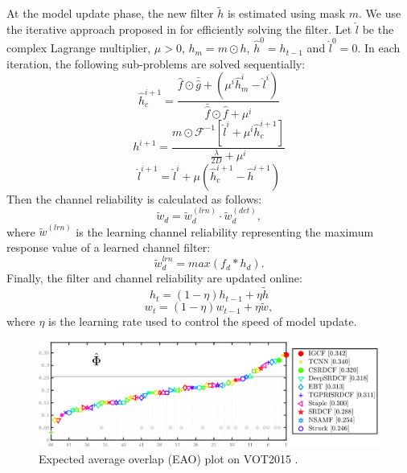 \documentclass[review]{elsarticle}
\begin{document}
\begin{CJK*}{UTF8}{gbsn}
At the model update phase, the new filter $\tilde{h}$ is estimated using mask $m$. We use the iterative approach proposed in \cite{Lukezic2017DiscriminativeCF} for efficiently solving the filter. Let $\hat{l}$ be the complex Lagrange multiplier, $\mu > 0$, $h_m=m \odot h$, $\hat{h}^0 = h_{t-1}$ and $\hat{l}^0 = 0$. In each iteration, the following sub-problems are solved sequentially:
\begin{equation} \label{eq:h1}
\hat{h}_c^{i+1} = \frac{\hat{f} \odot \bar{\hat{g}} +(\mu^i \hat{h}_m^i - \hat{l}^i)}{\bar{\hat{f}} \odot \hat f + \mu^i}
\end{equation}
\begin{equation}
h^{i+1} = \frac{m \odot \mathcal{F}^{-1}[\hat{l}^i + \mu^i\hat{h}_c^{i+1}]}{\frac{\lambda}{2D} + \mu^i}
\end{equation}
\begin{equation} \label{eq:h3}
\hat{l}^{i+1} = \hat{l}^i + \mu(\hat{h}_c^{i+1} - \hat{h}^{i+1})
\end{equation}
Then the channel reliability \cite{Lukezic2017DiscriminativeCF} is calculated as follows: 
\begin{equation} \label{eq:c}
\tilde w_d = \tilde w_d^{(lrn)} \cdot \tilde w_d^{(det)},
\end{equation}
where $\tilde{w}^{(lrn)}$ is the learning channel reliability representing the maximum response value of a learned channel filter:
\begin{equation} \label{eq:lrn}
\tilde{w}_d^{lrn} = max(f_d * h_d).
\end{equation}
Finally, the filter and channel reliability are updated online:
\begin{equation} \label{eq:update1}
h_t = (1 - \eta)h_{t-1} + \eta \tilde{h}
\end{equation}
\begin{equation} \label{eq:update2}
w_t = (1-\eta)w_{t-1} + \eta \tilde{w},
\end{equation}
where $\eta$ is the learning rate used to control the speed of model update.

\begin{figure}
    \centering
    \includegraphics[width=12cm]{images/vot/eao_rank_vot2015.png}
    \caption{Expected average overlap (EAO) plot on VOT2015 \cite{Kristan2015TheVO}.}
    \label{fig:vot15}
\end{figure}


\end{CJK*}
\end{document}
